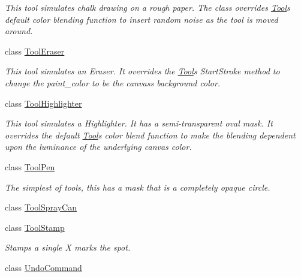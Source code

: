 \begin{DoxyCompactItemize}
\begin{DoxyCompactList}\small\item\em This tool simulates chalk drawing on a rough paper. The class overrides \hyperlink{classimage__tools_1_1Tool}{Tool}\textquotesingle{}s default color blending function to insert random noise as the tool is moved around. \end{DoxyCompactList}\item 
class \hyperlink{classimage__tools_1_1ToolEraser}{Tool\+Eraser}
\begin{DoxyCompactList}\small\item\em This tool simulates an Eraser. It overrides the \hyperlink{classimage__tools_1_1Tool}{Tool}\textquotesingle{}s Start\+Stroke method to change the paint\+\_\+color to be the canvas\textquotesingle{}s background color. \end{DoxyCompactList}\item 
class \hyperlink{classimage__tools_1_1ToolHighlighter}{Tool\+Highlighter}
\begin{DoxyCompactList}\small\item\em This tool simulates a Highlighter. It has a semi-\/transparent oval mask. It overrides the default \hyperlink{classimage__tools_1_1Tool}{Tool}\textquotesingle{}s color blend function to make the blending dependent upon the luminance of the underlying canvas color. \end{DoxyCompactList}\item 
class \hyperlink{classimage__tools_1_1ToolPen}{Tool\+Pen}
\begin{DoxyCompactList}\small\item\em The simplest of tools, this has a mask that is a completely opaque circle. \end{DoxyCompactList}\item 
class \hyperlink{classimage__tools_1_1ToolSprayCan}{Tool\+Spray\+Can}
\item 
class \hyperlink{classimage__tools_1_1ToolStamp}{Tool\+Stamp}
\begin{DoxyCompactList}\small\item\em Stamps a single X marks the spot. \end{DoxyCompactList}\item 
class \hyperlink{classimage__tools_1_1UndoCommand}{Undo\+Command}
\end{DoxyCompactItemize}
